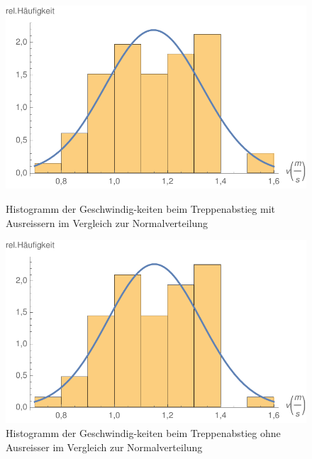 \begin{figure}[!htb]
    \centering
    \begin{minipage}{.49\textwidth}
        \centering
        \includegraphics[width=\textwidth]{abbildungen/Histogramm_2017_TreppeAb_MitAusreisser.pdf}
        \caption{Histogramm der Geschwindig-keiten beim Treppenabstieg mit Ausreissern im Vergleich zur Normalverteilung}
        \label{fig:Histogramm_TreppeAb_MA}
    \end{minipage}%
    \begin{minipage}{0.02\textwidth}
     \hfill
    \end{minipage}%
    \begin{minipage}{0.49\textwidth}
        \centering
        \includegraphics[width=\textwidth]{abbildungen/Histogramm_2017_TreppeAb_OhneAusreisser.pdf}
        \caption{Histogramm der Geschwindig-keiten beim Treppenabstieg ohne Ausreisser im Vergleich zur Normalverteilung}
        \label{fig:Histogramm_TreppeAb_OA}
    \end{minipage}
\end{figure}



